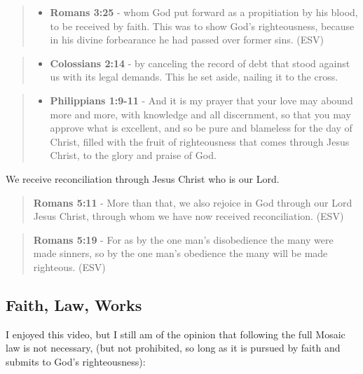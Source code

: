 \documentclass[11pt]{article}
\begin{document}
\begin{quote}
\begin{itemize}
\item \textbf{Romans 3:25} -  whom God put forward as a propitiation by his blood, to be received by faith.  This was to show God's righteousness, because in his divine forbearance he had passed over former sins.  (ESV)
\end{itemize}
\end{quote}

\begin{quote}
\begin{itemize}
\item \textbf{Colossians 2:14} - by canceling the record of debt that stood against us with its legal demands. This he set aside, nailing it to the cross.
\end{itemize}
\end{quote}

\begin{quote}
\begin{itemize}
\item \textbf{Philippians 1:9-11} - And it is my prayer that your love may abound more and more, with knowledge and all discernment, so that you may approve what is excellent, and so be pure and blameless for the day of Christ, filled with the fruit of righteousness that comes through Jesus Christ, to the glory and praise of God.
\end{itemize}
\end{quote}

We receive reconciliation through Jesus Christ who is our Lord.

\begin{quote}
\textbf{Romans 5:11} - More than that, we also rejoice in God through our Lord Jesus Christ, through whom we have now received reconciliation. (ESV)
\end{quote}

\begin{quote}
\textbf{Romans 5:19} - For as by the one man's disobedience the many were made sinners, so by the one man's obedience the many will be made righteous. (ESV)
\end{quote}

\subsection{Faith, Law, Works}
\label{sec:orga954a1c}
I enjoyed this video, but I still am of the opinion that following the full Mosaic law is not necessary, (but not prohibited, so long as it is pursued by faith and submits to God's righteousness):
\end{document}
